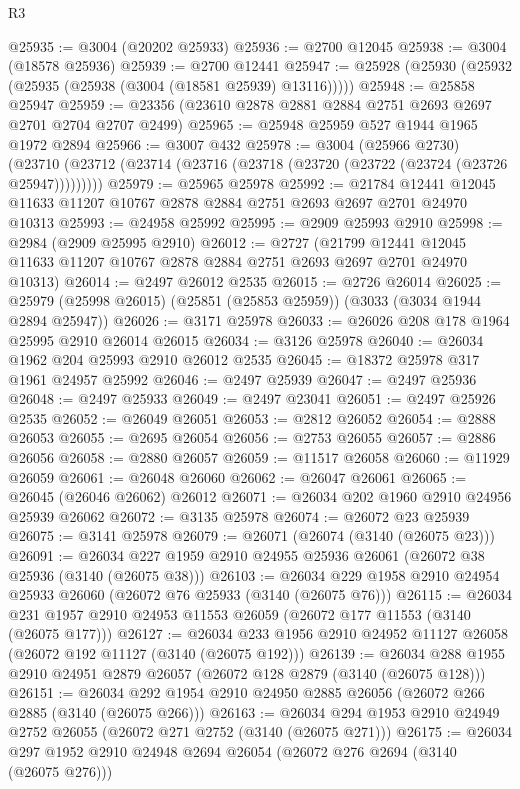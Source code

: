 \begin{lexlean}{R3}
\begin{coremodule}
@25935 := @3004 (@20202 @25933)
@25936 := @2700 @12045
@25938 := @3004 (@18578 @25936)
@25939 := @2700 @12441
@25947 := @25928 (@25930 (@25932 (@25935 (@25938 (@3004 (@18581 @25939) @13116)))))
@25948 := @25858 @25947
@25959 := @23356 (@23610 @2878 @2881 @2884 @2751 @2693 @2697 @2701 @2704 @2707 @2499)
@25965 := @25948 @25959 @527 @1944 @1965 @1972 @2894
@25966 := @3007 @432
@25978 := @3004
    (@25966 @2730)
    (@23710 (@23712 (@23714 (@23716 (@23718 (@23720 (@23722 (@23724 (@23726 @25947)))))))))
@25979 := @25965 @25978
@25992 := @21784
    @12441
    @12045
    @11633
    @11207
    @10767
    @2878
    @2884
    @2751
    @2693
    @2697
    @2701
    @24970
    @10313
@25993 := @24958 @25992
@25995 := @2909 @25993 @2910
@25998 := @2984 (@2909 @25995 @2910)
@26012 := @2727
    (@21799 @12441 @12045 @11633 @11207 @10767 @2878 @2884 @2751 @2693 @2697 @2701 @24970 @10313)
@26014 := @2497 @26012 @2535
@26015 := @2726 @26014
@26025 := @25979 (@25998 @26015) (@25851 (@25853 @25959)) (@3033 (@3034 @1944 @2894 @25947))
@26026 := @3171 @25978
@26033 := @26026 @208 @178 @1964 @25995 @2910 @26014 @26015
@26034 := @3126 @25978
@26040 := @26034 @1962 @204 @25993 @2910 @26012 @2535
@26045 := @18372 @25978 @317 @1961 @24957 @25992
@26046 := @2497 @25939
@26047 := @2497 @25936
@26048 := @2497 @25933
@26049 := @2497 @23041
@26051 := @2497 @25926 @2535
@26052 := @26049 @26051
@26053 := @2812 @26052
@26054 := @2888 @26053
@26055 := @2695 @26054
@26056 := @2753 @26055
@26057 := @2886 @26056
@26058 := @2880 @26057
@26059 := @11517 @26058
@26060 := @11929 @26059
@26061 := @26048 @26060
@26062 := @26047 @26061
@26065 := @26045 (@26046 @26062) @26012
@26071 := @26034 @202 @1960 @2910 @24956 @25939 @26062
@26072 := @3135 @25978
@26074 := @26072 @23 @25939
@26075 := @3141 @25978
@26079 := @26071 (@26074 (@3140 (@26075 @23)))
@26091 := @26034 @227 @1959 @2910 @24955 @25936 @26061 (@26072 @38 @25936 (@3140 (@26075 @38)))
@26103 := @26034 @229 @1958 @2910 @24954 @25933 @26060 (@26072 @76 @25933 (@3140 (@26075 @76)))
@26115 := @26034 @231 @1957 @2910 @24953 @11553 @26059 (@26072 @177 @11553 (@3140 (@26075 @177)))
@26127 := @26034 @233 @1956 @2910 @24952 @11127 @26058 (@26072 @192 @11127 (@3140 (@26075 @192)))
@26139 := @26034 @288 @1955 @2910 @24951 @2879 @26057 (@26072 @128 @2879 (@3140 (@26075 @128)))
@26151 := @26034 @292 @1954 @2910 @24950 @2885 @26056 (@26072 @266 @2885 (@3140 (@26075 @266)))
@26163 := @26034 @294 @1953 @2910 @24949 @2752 @26055 (@26072 @271 @2752 (@3140 (@26075 @271)))
@26175 := @26034 @297 @1952 @2910 @24948 @2694 @26054 (@26072 @276 @2694 (@3140 (@26075 @276)))

\end{coremodule}
\end{lexlean}
